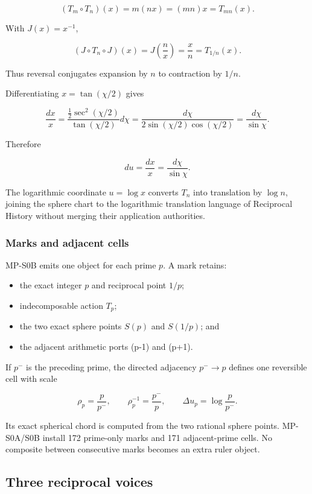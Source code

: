 \[
(T_m\circ T_n)(x)=m(nx)=(mn)x=T_{mn}(x).
\]

With \(J(x)=x^{-1}\),

\[
(J\circ T_n\circ J)(x)
=J\!\left(\frac n x\right)
=\frac x n
=T_{1/n}(x).
\]

Thus reversal conjugates expansion by \(n\) to contraction by \(1/n\).

Differentiating \(x=\tan(\chi/2)\) gives

\[
\frac{dx}{x}
=\frac{\tfrac12\sec^2(\chi/2)}{\tan(\chi/2)}d\chi
=\frac{d\chi}{2\sin(\chi/2)\cos(\chi/2)}
=\frac{d\chi}{\sin\chi}.
\]

Therefore

\[
du=\frac{dx}{x}=\frac{d\chi}{\sin\chi}.
\]

The logarithmic coordinate \(u=\log x\) converts \(T_n\) into
translation by \(\log n\), joining the sphere chart to the logarithmic
translation language of Reciprocal History without merging their
application authorities.

\subsubsection{Marks and adjacent cells}\label{viii-ch10-marks-and-adjacent-cells}

MP-S0B emits one object for each prime \(p\). A mark retains:

\begin{itemize}
\tightlist
\item
  the exact integer \(p\) and reciprocal point \(1/p\);
\item
  indecomposable action \(T_p\);
\item
  the two exact sphere points \(S(p)\) and \(S(1/p)\); and
\item
  the adjacent arithmetic ports (p-1) and (p+1).
\end{itemize}

If \(p^-\) is the preceding prime, the directed adjacency \(p^-\to p\)
defines one reversible cell with scale

\[
\rho_p=\frac p{p^-},
\qquad
\rho_p^{-1}=\frac{p^-}{p},
\qquad
\Delta u_p=\log\frac p{p^-}.
\]

Its exact spherical chord is computed from the two rational sphere
points. MP-S0A/S0B install 172 prime-only marks and 171 adjacent-prime
cells. No composite between consecutive marks becomes an extra ruler
object.

\subsection{Three reciprocal voices}\label{viii-ch10-three-reciprocal-voices}

